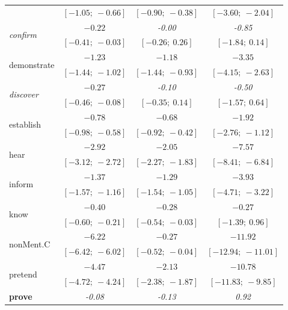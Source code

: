 \documentclass[11pt,fleqn]{article}
\newcommand{\6}{\mbox{$[\hspace*{-.6mm}[$}}
\newcommand{\9}{\mbox{$]\hspace*{-.6mm}]$}}
\begin{document}
\begin{table}
\begin{center}
\begin{tabular}{l c c c}
                        & $[-1.05;\ -0.66]$ & $[-0.90;\ -0.38]$ & $[-3.60;\ -2.04]$   \\
\multirow{2}{*}{\emph{confirm}}          & $-0.22$       & \emph{-0.00}           & \emph{-0.85}             \\
                        & $[-0.41;\ -0.03]$ & $[-0.26;\ 0.26]$  & $[-1.84;\ 0.14]$    \\
\multirow{2}{*}{demonstrate}      & $-1.23$       & $-1.18$       & $-3.35$         \\
                        & $[-1.44;\ -1.02]$ & $[-1.44;\ -0.93]$ & $[-4.15;\ -2.63]$   \\
\multirow{2}{*}{\emph{discover}}         & $-0.27$       & \emph{-0.10}           & \emph{-0.50}             \\
                        & $[-0.46;\ -0.08]$ & $[-0.35;\ 0.14]$  & $[-1.57;\ 0.64]$    \\
\multirow{2}{*}{establish}        & $-0.78$       & $-0.68$       & $-1.92$         \\
                        & $[-0.98;\ -0.58]$ & $[-0.92;\ -0.42]$ & $[-2.76;\ -1.12]$   \\
\multirow{2}{*}{hear}             & $-2.92$       & $-2.05$       & $-7.57$         \\
                        & $[-3.12;\ -2.72]$ & $[-2.27;\ -1.83]$ & $[-8.41;\ -6.84]$   \\
\multirow{2}{*}{inform}           & $-1.37$       & $-1.29$       & $-3.93$         \\
                        & $[-1.57;\ -1.16]$ & $[-1.54;\ -1.05]$ & $[-4.71;\ -3.22]$   \\
\multirow{2}{*}{know}             & $-0.40$       & $-0.28$       & $-0.27$             \\
                        & $[-0.60;\ -0.21]$ & $[-0.54;\ -0.03]$ & $[-1.39;\ 0.96]$    \\
\multirow{2}{*}{nonMent.C}        & $-6.22$       & $-0.27$       & $-11.92$        \\
                        & $[-6.42;\ -6.02]$ & $[-0.52;\ -0.04]$ & $[-12.94;\ -11.01]$ \\
\multirow{2}{*}{pretend}          & $-4.47$       & $-2.13$       & $-10.78$        \\
                        & $[-4.72;\ -4.24]$ & $[-2.38;\ -1.87]$ & $[-11.83;\ -9.85]$  \\
\multirow{2}{*}{\textbf{prove}}            & \emph{-0.08}           & \emph{-0.13}           & \emph{0.92}              \\

\end{tabular}
\end{center}
\end{table}
\end{document}
